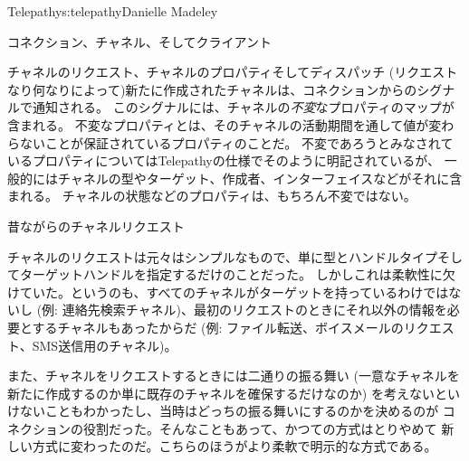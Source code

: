 \begin{aosachapter}{Telepathy}{s:telepathy}{Danielle Madeley}
\begin{aosasect1}{コネクション、チャネル、そしてクライアント}
\begin{aosasect2}{チャネルのリクエスト、チャネルのプロパティそしてディスパッチ}
(リクエストなり何なりによって)新たに作成されたチャネルは、コネクションからのシグナルで通知される。
このシグナルには、チャネルの\emph{不変}なプロパティのマップが含まれる。
不変なプロパティとは、そのチャネルの活動期間を通して値が変わらないことが保証されているプロパティのことだ。
不変であろうとみなされているプロパティについてはTelepathyの仕様でそのように明記されているが、
一般的にはチャネルの型やターゲット、作成者、インターフェイスなどがそれに含まれる。
チャネルの状態などのプロパティは、もちろん不変ではない。

\begin{aosabox}{昔ながらのチャネルリクエスト}

チャネルのリクエストは元々はシンプルなもので、単に型とハンドルタイプそしてターゲットハンドルを指定するだけのことだった。
しかしこれは柔軟性に欠けていた。というのも、すべてのチャネルがターゲットを持っているわけではないし
(例: 連絡先検索チャネル)、最初のリクエストのときにそれ以外の情報を必要とするチャネルもあったからだ
(例: ファイル転送、ボイスメールのリクエスト、SMS送信用のチャネル)。

また、チャネルをリクエストするときには二通りの振る舞い
(一意なチャネルを新たに作成するのか単に既存のチャネルを確保するだけなのか)
を考えないといけないこともわかったし、当時はどっちの振る舞いにするのかを決めるのが
コネクションの役割だった。そんなこともあって、かつての方式はとりやめて
新しい方式に変わったのだ。こちらのほうがより柔軟で明示的な方式である。


\end{aosabox}
\end{aosasect2}
\end{aosasect1}
\end{aosachapter}
